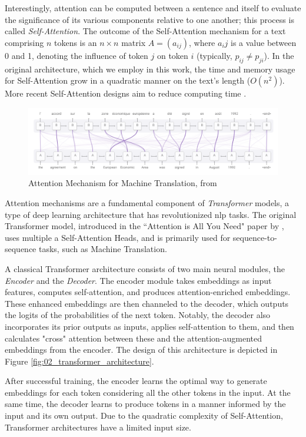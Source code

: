 Interestingly, attention can be computed between a sentence and itself to evaluate the significance of its various components relative to one another; this process is called \emph{Self-Attention}. The outcome of the Self-Attention mechanism for a text comprising $n$ tokens is an $n\times n$ matrix $A=(a_{ij})$, where $a_ij$ is a value between 0 and 1, denoting the influence of token $j$ on token $i$ (typically, $p_{ij}\neq p_{ji}$). In the original architecture, which we employ in this work, the time and memory usage for Self-Attention grow in a quadratic manner on the text's length ($O(n^2)$). More recent Self-Attention designs aim to reduce computing time \cite{flash_attention}.


\begin{figure}
    \centering
    \includegraphics[width=.75\textwidth]{Figures/02/Attention_for_translation.png}
    \caption{Attention Mechanism for Machine Translation, from }
    \label{fig:02_attention_for_translation}
\end{figure}


Attention mechanisms are a fundamental component of \emph{Transformer} models, a type of deep learning architecture that has revolutionized \gls{nlp} tasks. The original Transformer model, introduced in the ``Attention is All You Need" paper by \cite{attention_is_all_you_need}, uses multiple a Self-Attention Heads, and is primarily used for sequence-to-sequence tasks, such as Machine Translation.

A classical Transformer architecture consists of two main neural modules, the \emph{Encoder} and the \emph{Decoder}. The encoder module takes embeddings as input features, computes self-attention, and produces attention-enriched embeddings.
These enhanced embeddings are then channeled to the decoder, which outputs the logits of the probabilities of the next token.
Notably, the decoder also incorporates its prior outputs as inputs, applies self-attention to them, and then calculates "cross" attention between these and the attention-augmented embeddings from the encoder. The design of this architecture is depicted in Figure \ref{fig:02_transformer_architecture}.

After successful training, the encoder learns the optimal way to generate embeddings for each token considering all the other tokens in the input. At the same time, the decoder learns to produce tokens in a manner informed by the input and its own output. Due to the quadratic complexity of Self-Attention, Transformer architectures have a limited input size.


